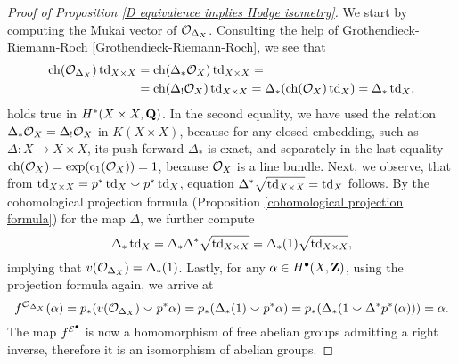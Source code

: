 \begin{proof}[Proof of Proposition \ref{D equivalence implies Hodge isometry}]
    We start by computing the Mukai vector of $\mathcal{O}_{\Delta_X}$. Consulting the help of Grothendieck-Riemann-Roch \ref{Grothendieck-Riemann-Roch}, we see that
    \begin{align*}
        \ch(\struct{\Delta_X}) \tdclass{X \times X} &= \ch(\Delta_*\struct{X})\tdclass{X \times X} = \\ &= \ch(\Delta_!\struct{X})\tdclass{X \times X} = \Delta_*(\ch(\struct{X}) \tdclass{X}) = \Delta_*\tdclass{X},
    \end{align*}
    holds true in $H^{*}(X \times X, \mathbf Q)$. In the second equality, we have used the relation $\Delta_*\mathcal{O}_{X} = \Delta_!\mathcal{O}_{X}$ in $K(X \times X)$, because for any closed embedding, such as $\Delta \colon X \to X \times X$, its push-forward $\Delta_*$ is exact, and separately in the last equality $\ch(\struct{X}) = \exp(\cclass[1](\struct{X})) = 1$, because $\mathcal{O}_{X}$ is a line bundle. Next, we observe, that from $\operatorname{td}_{X \times X} = p^*\operatorname{td}_{X} \smallsmile p^*\operatorname{td}_{X}$, equation $\Delta^*\sqrt{\operatorname{td}_{X\times X}} = \operatorname{td}_{X}$ follows. By the cohomological projection formula (\cf Proposition \ref{cohomological projection formula}) for the map $\Delta$, we further compute
    \[
        \Delta_*\operatorname{td}_{X} = \Delta_*\Delta^*\sqrt{\operatorname{td}_{X \times X}} = \Delta_*(1)\sqrt{\operatorname{td}_{X \times X}},
    \] 
    implying that $v(\mathcal{O}_{\Delta_X}) = \Delta_*(1)$. 
    Lastly, for any $\alpha \in H^{\bullet}(X, \mathbf Z)$, using the projection formula again, we arrive at
    \[
        f^{\mathcal{O}_{\Delta_X}}(\alpha) = p_*(v(\mathcal{O}_{\Delta_X})\smallsmile p^*\alpha) = p_*(\Delta_*(1)\smallsmile p^*\alpha) = p_*(\Delta_*(1\smallsmile \Delta^*p^*(\alpha))) = \alpha.
    \]
    The map $f^{\mathcal E^\bullet}$ is now a homomorphism of free abelian groups admitting a right inverse, therefore it is an isomorphism of abelian groups.


\end{proof}
